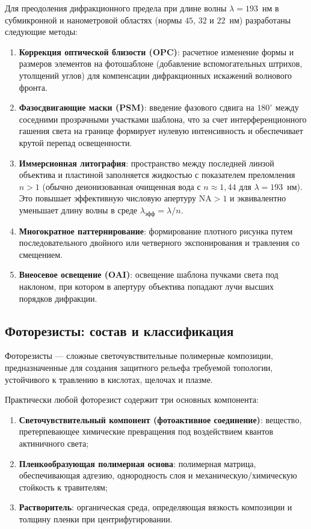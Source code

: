 \documentclass[12pt,a4paper]{article}
\theoremstyle{plain}
\theoremstyle{definition}
\theoremstyle{remark}
\numberwithin{equation}{section}
\begin{document}
Для преодоления дифракционного предела при длине волны $\lambda = 193$~нм в субмикронной 
и нанометровой областях (нормы $45$, $32$ и $22$~нм) разработаны следующие методы:
\begin{enumerate}
  \item \textbf{Коррекция оптической близости (OPC)}: расчетное изменение формы и размеров 
  элементов на фотошаблоне (добавление вспомогательных штрихов, утолщений углов) для 
  компенсации дифракционных искажений волнового фронта.
  \item \textbf{Фазосдвигающие маски (PSM)}: введение фазового сдвига на $180^\circ$ между 
  соседними прозрачными участками шаблона, что за счет интерференционного гашения света 
  на границе формирует нулевую интенсивность и обеспечивает крутой перепад освещенности.
  \item \textbf{Иммерсионная литография}: пространство между последней линзой объектива и 
  пластиной заполняется жидкостью с показателем преломления $n > 1$ (обычно деионизованная 
  очищенная вода с $n \approx 1{,}44$ для $\lambda = 193$~нм). Это повышает эффективную числовую 
  апертуру $\mathrm{NA} > 1$ и эквивалентно уменьшает длину волны в среде $\lambda_\text{эфф} = \lambda / n$.
  \item \textbf{Многократное паттернирование}: формирование плотного рисунка путем последовательного 
  двойного или четверного экспонирования и травления со смещением.
  \item \textbf{Внеосевое освещение (OAI)}: освещение шаблона пучками света под наклоном, при котором 
  в апертуру объектива попадают лучи высших порядков дифракции.
\end{enumerate}

\subsection{Фоторезисты: состав и классификация}

Фоторезисты — сложные светочувствительные полимерные композиции, предназначенные для создания 
защитного рельефа требуемой топологии, устойчивого к травлению в кислотах, щелочах и плазме.

Практически любой фоторезист содержит три основных компонента:
\begin{enumerate}
  \item \textbf{Светочувствительный компонент (фотоактивное соединение)}: вещество, претерпевающее 
  химические превращения под воздействием квантов актиничного света;
  \item \textbf{Пленкообразующая полимерная основа}: полимерная матрица, обеспечивающая адгезию, 
  однородность слоя и механическую/химическую стойкость к травителям;
  \item \textbf{Растворитель}: органическая среда, определяющая вязкость композиции и толщину 
  пленки при центрифугировании.
\end{enumerate}
\end{document}

